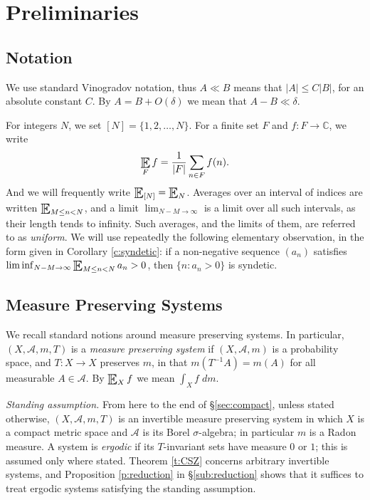 \section{Preliminaries} \label{s:prelim} 

\subsection{Notation} 
We use standard Vinogradov notation, thus $A\ll B$ means that $\lvert A\rvert \leq C \lvert B\rvert$, 
for an absolute constant $C$. By $A=B+O(\delta)$ we mean that $A-B \ll \delta$.  

For integers $N$, we set $[N] = \{1,2, \ldots, N\}$. 
For a finite set $F$ and $f \colon F\to \mathbb C$, we write 
\begin{equation}
    \Expectation_F f = \frac{1}{\lvert F\rvert} 
    \sum_{n\in F} f(n). 
\end{equation}
And we will frequently write $\Expectation_{[N]}=\Expectation_N$.  
Averages over an interval of indices are written $\Expectation_{M\leq n<N}$, 
and a limit $\lim_{N-M\to\infty}$ is a limit over all such intervals, as their length tends to infinity.  
Such averages, and the limits of them, are referred to as \emph{uniform}.  
We will use repeatedly the following elementary observation, in the form given in Corollary \ref{c:syndetic}: 
if a non-negative sequence $(a_n)$ satisfies $\liminf_{N-M\to\infty} \Expectation_{M\leq n<N} a_n>0$, 
then $\{n \colon a_n >0\}$ is syndetic.  

\subsection{Measure Preserving Systems} \label{sub:mps}

We recall standard notions around measure preserving systems.  
In particular, $(X,\mathcal A,m,T)$ 
is a \emph{measure preserving system} if $(X,\mathcal A,m)$ is a probability space, and $T \colon X\to X$ preserves $m$, in that $m(T^{-1} A)=m(A)$ for all measurable $A\in \mathcal A$.  
By $\Expectation_X f $ we mean $\int_X f \;dm$. 

\emph{Standing assumption.}  From here to the end of \S\ref{sec:compact}, unless stated otherwise, $(X,\mathcal A,m,T)$ is an invertible measure preserving system 
in which $X$ is a compact metric space and $\mathcal A$ is its Borel $\sigma$-algebra; in particular $m$ is a Radon measure.  
A system is \emph{ergodic} if its $T$-invariant sets have measure $0$ or $1$; this is assumed only where stated.  
Theorem \ref{t:CSZ} concerns arbitrary invertible systems, and Proposition \ref{p:reduction} in \S\ref{sub:reduction} shows that it suffices to treat 
ergodic systems satisfying the standing assumption.  






